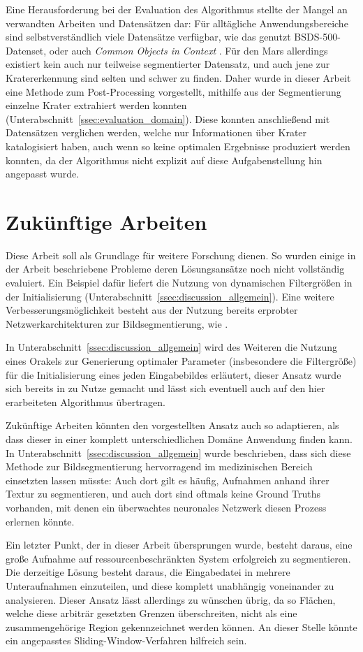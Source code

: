 Eine Herausforderung bei der Evaluation des Algorithmus stellte der Mangel an verwandten Arbeiten und Datensätzen dar: Für alltägliche Anwendungsbereiche sind selbstverständlich viele Datensätze verfügbar, wie das genutzt BSDS-500-Datenset, oder auch \textit{Common Objects in Context} \cite{lin_14}. Für den Mars allerdings existiert kein auch nur teilweise segmentierter Datensatz, und auch jene zur Kratererkennung sind selten und schwer zu finden. Daher wurde in dieser Arbeit eine Methode zum Post-Processing vorgestellt, mithilfe aus der Segmentierung einzelne Krater extrahiert werden konnten (\vgl Unterabschnitt~\ref{ssec:evaluation_domain}). Diese konnten anschließend mit Datensätzen verglichen werden, welche nur Informationen über Krater katalogisiert haben, auch wenn so keine optimalen Ergebnisse produziert werden konnten, da der Algorithmus nicht explizit auf diese Aufgabenstellung hin angepasst wurde.

\section{Zukünftige Arbeiten}

Diese Arbeit soll als Grundlage für weitere Forschung dienen. So wurden einige in der Arbeit beschriebene Probleme \bzw deren Lösungsansätze noch nicht vollständig evaluiert. Ein Beispiel dafür liefert die Nutzung von dynamischen Filtergrößen in der Initialisierung (\vgl Unterabschnitt~\ref{ssec:discussion_allgemein}). Eine weitere Verbesserungsmöglichkeit besteht aus der Nutzung bereits erprobter Netzwerkarchitekturen zur Bildsegmentierung, wie \bspw \cite{ronneberger_15}.

In Unterabschnitt~\ref{ssec:discussion_allgemein} wird des Weiteren die Nutzung eines Orakels zur Generierung optimaler Parameter (insbesondere die Filtergröße) für die Initialisierung eines jeden Eingabebildes erläutert, dieser Ansatz wurde sich bereits in \cite{arbelaez_10} zu Nutze gemacht und lässt sich eventuell auch auf den hier erarbeiteten Algorithmus übertragen.

Zukünftige Arbeiten könnten den vorgestellten Ansatz auch so adaptieren, als dass dieser in einer komplett unterschiedlichen Domäne Anwendung finden kann. In Unterabschnitt~\ref{ssec:discussion_allgemein} wurde beschrieben, dass sich diese Methode zur Bildsegmentierung hervorragend im medizinischen Bereich einsetzten lassen müsste: Auch dort gilt es häufig, Aufnahmen anhand ihrer Textur zu segmentieren, und auch dort sind oftmals keine Ground Truths vorhanden, mit denen ein überwachtes neuronales Netzwerk diesen Prozess erlernen könnte.

Ein letzter Punkt, der in dieser Arbeit übersprungen wurde, besteht daraus, eine große Aufnahme auf ressourcenbeschränkten System erfolgreich zu segmentieren. Die derzeitige Lösung besteht daraus, die Eingabedatei in mehrere Unteraufnahmen einzuteilen, und diese komplett unabhängig voneinander zu analysieren. Dieser Ansatz lässt allerdings zu wünschen übrig, da so Flächen, welche diese arbiträr gesetzten Grenzen überschreiten, nicht als eine zusammengehörige Region gekennzeichnet werden können. An dieser Stelle könnte ein angepasstes Sliding-Window-Verfahren hilfreich sein.